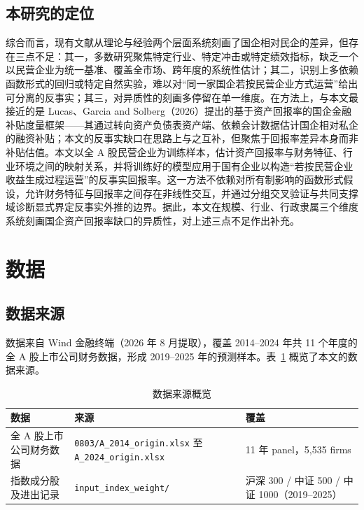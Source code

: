 \documentclass[11pt,a4paper]{ctexart}
\begin{document}
\subsection{本研究的定位}

综合而言，现有文献从理论与经验两个层面系统刻画了国企相对民企的差异，但存在三点不足：其一，多数研究聚焦特定行业、特定冲击或特定绩效指标，缺乏一个以民营企业为统一基准、覆盖全市场、跨年度的系统性估计；其二，识别上多依赖函数形式的回归或特定自然实验，难以对“同一家国企若按民营企业方式运营”给出可分离的反事实；其三，对异质性的刻画多停留在单一维度。在方法上，与本文最接近的是 Lucas、Garcia and Solberg（2026）提出的基于资产回报率的国企金融补贴度量框架——其通过转向资产负债表资产端、依赖会计数据估计国企相对私企的融资补贴；本文的反事实缺口在思路上与之互补，但聚焦于回报率差异本身而非补贴估值。本文以全 A 股民营企业为训练样本，估计资产回报率与财务特征、行业环境之间的映射关系，并将训练好的模型应用于国有企业以构造“若按民营企业收益生成过程运营”的反事实回报率。这一方法不依赖对所有制影响的函数形式假设，允许财务特征与回报率之间存在非线性交互，并通过分组交叉验证与共同支撑域诊断显式界定反事实外推的边界。据此，本文在规模、行业、行政隶属三个维度系统刻画国企资产回报率缺口的异质性，对上述三点不足作出补充。

\section{数据}

\subsection{数据来源}

数据来自 Wind 金融终端（2026 年 8 月提取），覆盖 2014--2024 年共 11 个年度的全 A 股上市公司财务数据，形成 2019--2025 年的预测样本。表~\ref{tab:datasource} 概览了本文的数据来源。

\begin{table}[htbp]
\centering
\caption{数据来源概览}
\label{tab:datasource}
\begin{threeparttable}
\small
\begin{tabular}{lll}
\toprule
数据 & 来源 & 覆盖 \\
\midrule
全 A 股上市公司财务数据 & \texttt{0803/A\_2014\_origin.xlsx} 至 \texttt{A\_2024\_origin.xlsx} & 11 年 panel，5{,}535 firms \\
指数成分股及进出记录 & \texttt{input\_index\_weight/} & 沪深 300 / 中证 500 / 中证 1000（2019--2025） \\
\bottomrule
\end{tabular}
\end{threeparttable}
\end{table}
\end{document}
